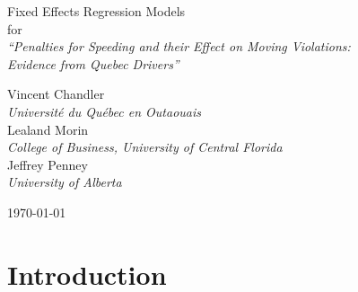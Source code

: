 \documentclass[12pt]{paper}
\begin{document}
\phantom{0}
\vspace{1.0in}


\begin{centering}

{\huge 
Fixed Effects Regression Models  \\
\bigskip
for \\
\bigskip
{\it ``Penalties for Speeding and their Effect on Moving Violations: \\
	Evidence from Quebec Drivers''} \\
}

\vspace{1.25in}


{\large 
Vincent Chandler \\
{\it Universit\'{e} du Qu\'{e}bec en Outaouais} \\
\medskip
Lealand Morin \\
{\it College of Business, University of Central Florida} \\
\medskip
Jeffrey Penney \\
{\it University of Alberta} \\
}

\vspace{1.25in}



\today

\end{centering}

\pagebreak

\section*{Introduction}
\end{document}
